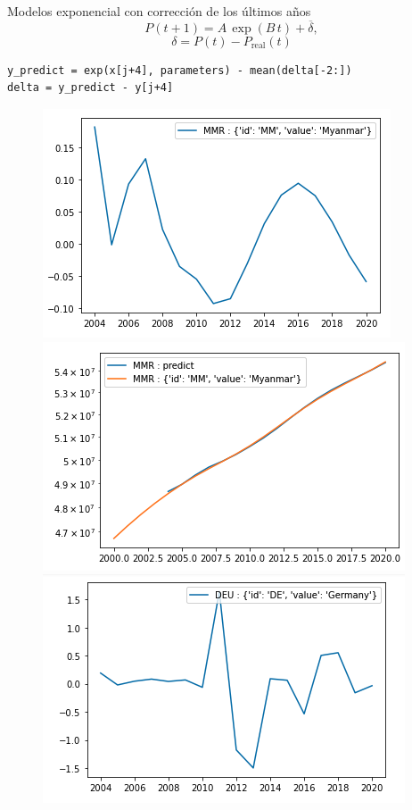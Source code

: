 \documentclass[10pt]{beamer}
\begin{document}
\begin{frame}[fragile]{Modelos exponencial con corrección de los últimos años}
\begin{equation*}
P(t+1) = A\,\exp(B\,t) + \overline{\delta},
\end{equation*}
\begin{equation*}
\delta = P(t) - P_\text{real}(t) 
\end{equation*}
\begin{verbatim}
y_predict = exp(x[j+4], parameters) - mean(delta[-2:])
delta = y_predict - y[j+4]
\end{verbatim}
\begin{figure}
\includegraphics[scale=0.28]{img/9.png}
\includegraphics[scale=0.28]{img/10.png}
\includegraphics[scale=0.28]{img/11.png}

\end{figure}
\end{frame}
\end{document}
